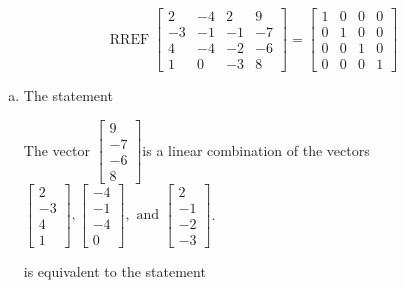 \begin{exerciseAnswer} 
\[\operatorname{RREF}  \left[\begin{array}{ccc|c}
2 & -4 & 2 & 9 \\
-3 & -1 & -1 & -7 \\
4 & -4 & -2 & -6 \\
1 & 0 & -3 & 8
\end{array}\right] = \left[\begin{array}{ccc|c}
1 & 0 & 0 & 0 \\
0 & 1 & 0 & 0 \\
0 & 0 & 1 & 0 \\
0 & 0 & 0 & 1
\end{array}\right] \]
\begin{enumerate}[(a)]
\item  The statement 
\begin{center}\begin{minipage}{0.8\textwidth}
 The vector \( \left[\begin{array}{c}
9 \\
-7 \\
-6 \\
8
\end{array}\right] \)is a linear combination of the vectors \( \left[\begin{array}{c}
2 \\
-3 \\
4 \\
1
\end{array}\right] , \left[\begin{array}{c}
-4 \\
-1 \\
-4 \\
0
\end{array}\right] , \text{ and } \left[\begin{array}{c}
2 \\
-1 \\
-2 \\
-3
\end{array}\right] \). 
\end{minipage}\end{center}
     is equivalent to the statement 
\begin{center}\begin{minipage}{0.8\textwidth}
 The vector equation \( x_{1} \left[\begin{array}{c}
2 \\
-3 \\
4 \\
1

\end{array}
\end{minipage}
\end{center}
\end{enumerate}
\end{exerciseAnswer}
